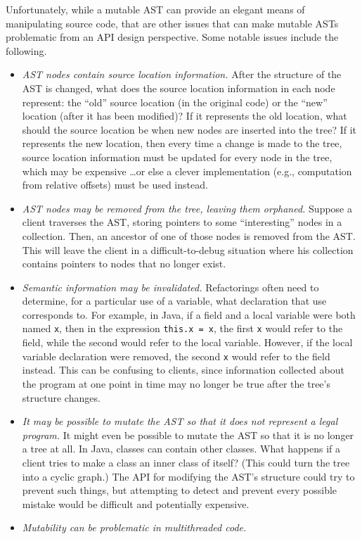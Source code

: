 \documentclass[prodmode]{acmlarge}
\newcommand{\ttt}[1]{\texttt{#1}}
\begin{document}
Unfortunately, while a mutable AST can provide an elegant means of manipulating
source code, that are other issues that can make mutable ASTs problematic from
an API design perspective.  Some notable issues include the following.
\begin{itemize}
\item \textit{AST nodes contain source location information.}  After the
structure of the AST is changed, what does the source location information in
each node represent: the ``old'' source location (in the original code) or the
``new'' location (after it has been modified)?  If it represents the old
location, what should the source location be when new nodes are inserted into
the tree?  If it represents the new location, then every time a change is made
to the tree, source location information must be updated for every node in the
tree, which may be expensive \dots or else a clever implementation (e.g.,
computation from relative offsets) must be used instead.
\item \textit{AST nodes may be removed from the tree, leaving them orphaned.}
Suppose a client traverses the AST, storing pointers to some ``interesting''
nodes in a collection.  Then, an ancestor of one of those nodes is removed from
the AST.  This will leave the client in a difficult-to-debug situation where
his collection contains pointers to nodes that no longer exist.
\item \textit{Semantic information may be invalidated.}  Refactorings often
need to determine, for a particular use of a variable, what declaration that
use corresponds to.  For example, in Java, if a field and a local variable were
both named \ttt{x}, then in the expression \ttt{this.x = x}, the first \ttt{x}
would refer to the field, while the second would refer to the local variable.
However, if the local variable declaration were removed, the second \ttt{x}
would refer to the field instead.  This can be confusing to clients, since
information collected about the program at one point in time may no longer be
true after the tree's structure changes.
\item \textit{It may be possible to mutate the AST so that it does not
represent a legal program.}  It might even be possible to mutate the AST so
that it is no longer a tree at all.  In Java, classes can contain other
classes.  What happens if a client tries to make a class an inner class of
itself?  (This could turn the tree into a cyclic graph.)  The API for modifying
the AST's structure could try to prevent such things, but attempting to detect
and prevent every possible mistake would be difficult and potentially
expensive.
\item \textit{Mutability can be problematic in multithreaded code.}
\end{itemize}
\end{document}
